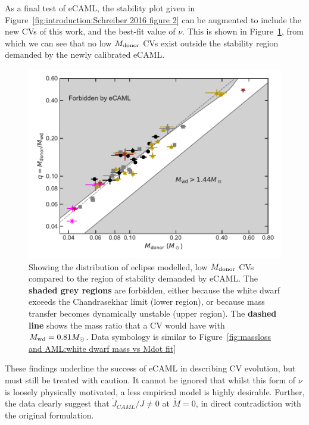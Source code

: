 As a final test of eCAML, the stability plot given in Figure~\ref{fig:introduction:Schreiber 2016 figure 2} can be augmented to include the new CVs of this work, and the best-fit value of $\nu$.
This is shown in Figure~\ref{fig:massloss and AML:calibrated eCAML}, from which we can see that no low $M_{\rm donor}$ CVs exist outside the stability region demanded by the newly calibrated eCAML.
\begin{figure}
    \centering
    \includegraphics[width=\textwidth]{figures/results/Mdot/ecaml_nointercept.pdf}
    \caption{Showing the distribution of eclipse modelled, low $M_{\rm donor}$ CVs compared to the region of stability demanded by eCAML. The {\bf shaded grey regions} are forbidden, either because the white dwarf exceeds the Chandrasekhar limit (lower region), or because mass transfer becomes dynamically unstable (upper region). The {\bf dashed line} shows the mass ratio that a CV would have with $M_{\rm wd} = 0.81 M_\odot$. Data symbology is similar to Figure~\ref{fig:massloss and AML:white dwarf mass vs Mdot fit}}
    \label{fig:massloss and AML:calibrated eCAML}
\end{figure}
These findings underline the success of eCAML in describing CV evolution, but must still be treated with caution. It cannot be ignored that whilst this form of $\nu$ is loosely physically motivated, a less empirical model is highly desirable.
Further, the data clearly suggest that $\dot J_{CAML} / J \neq 0$ at $\dot M = 0$, in direct contradiction with the original formulation. 

